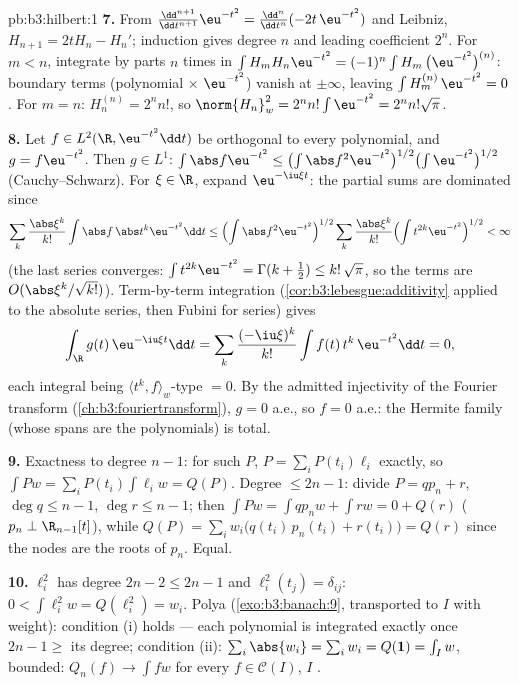 \begin{solution}{pb:b3:hilbert:1}
\textbf{7.} From $\frac{\dd^{n+1}}{\dd t^{n+1}}\eu^{-t^2} =
\frac{\dd^n}{\dd t^n}(-2t\,\eu^{-t^2})$ and Leibniz, $H_{n+1}
= 2tH_n - H_n'$; induction gives degree $n$ and leading
coefficient $2^n$. For $m < n$, integrate by parts $n$ times
in $\int H_m H_n\eu^{-t^2} = (-1)^n\int H_m\,\bigl(\eu^{-t^2}
\bigr)^{(n)}$: boundary terms (polynomial $\times$
$\eu^{-t^2}$) vanish at $\pm\infty$, leaving $\int
H_m^{(n)}\,\eu^{-t^2} = 0$. For $m = n$: $H_n^{(n)} = 2^nn!$,
so $\norm{H_n}_w^2 = 2^nn!\int\eu^{-t^2} = 2^nn!\sqrt\pi$.

\textbf{8.} Let $f \in L^2(\R, \eu^{-t^2}\dd t)$ be orthogonal
to every polynomial, and $g = f\eu^{-t^2}$. Then $g \in
L^1$: $\int\abs f\eu^{-t^2} \leq \bigl(\int\abs
f^2\eu^{-t^2}\bigr)^{1/2}\bigl(\int\eu^{-t^2}\bigr)^{1/2}$
(Cauchy--Schwarz). For $\xi \in \R$, expand $\eu^{-\iu\xi t}$:
the partial sums are dominated since
\[
\sum_k\frac{\abs\xi^k}{k!}\int\abs f\,\abs t^k\eu^{-t^2}\dd t
\leq \Bigl(\int \abs f^2\eu^{-t^2}\Bigr)^{1/2}
\sum_k\frac{\abs\xi^k}{k!}\Bigl(\int
t^{2k}\eu^{-t^2}\Bigr)^{1/2} < \infty
\]
(the last series converges: $\int t^{2k}\eu^{-t^2} =
\Gamma(k+\frac12) \leq k!\,\sqrt\pi$, so the terms are
$O(\abs\xi^k/\sqrt{k!})$). Term-by-term integration
(\cref{cor:b3:lebesgue:additivity} applied to the absolute
series, then Fubini for series) gives
\[
\int_\R g(t)\,\eu^{-\iu\xi t}\dd t
= \sum_k\frac{(-\iu\xi)^k}{k!}\int f(t)\,t^k\,\eu^{-t^2}\dd t
= 0 ,
\]
each integral being $\langle t^k, f\rangle_w$-type $= 0$. By
the admitted injectivity of the Fourier transform
(\cref{ch:b3:fouriertransform}), $g = 0$ a.e., so $f = 0$
a.e.: the Hermite family (whose spans are the polynomials) is
total.

\textbf{9.} Exactness to degree $n - 1$: for such $P$, $P =
\sum_iP(t_i)\ell_i$ exactly, so $\int Pw = \sum_iP(t_i)\int
\ell_iw = Q(P)$. Degree $\leq 2n - 1$: divide $P = qp_n + r$,
$\deg q \leq n - 1$, $\deg r \leq n-1$; then $\int Pw = \int
qp_nw + \int rw = 0 + Q(r)$ ($p_n \perp \R_{n-1}[t]$), while
$Q(P) = \sum_iw_i\bigl(q(t_i)\,p_n(t_i) + r(t_i)\bigr) = Q(r)$
since the nodes are the roots of $p_n$. Equal.

\textbf{10.} $\ell_i^2$ has degree $2n - 2 \leq 2n - 1$ and
$\ell_i^2(t_j) = \delta_{ij}$: $0 < \int\ell_i^2w = Q(\ell_i^2)
= w_i$. Polya (\cref{exo:b3:banach:9}, transported to $I$ with
weight): condition (i) holds --- each polynomial is integrated
exactly once $2n - 1 \geq$ its degree; condition (ii):
$\sum_i\abs{w_{i}} = \sum_iw_i = Q(\mathbf 1) = \int_Iw$,
bounded: $Q_n(f) \to \int fw$ for every $f \in \mathcal C(I)$,
$I$ .


\end{solution}

